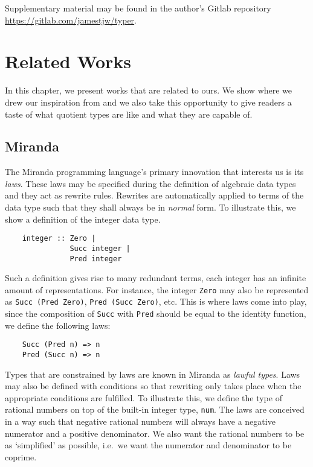 \documentclass[12pt,twoside,maitrise]{dms}
\theoremstyle{definition}
\numberwithin{equation}{section}
\numberwithin{table}{chapter}
\numberwithin{figure}{chapter}
\newcommand\id[1] {\texttt{#1}}
\newcommand\fn[1] {\texttt{#1}}
\begin{document}
Supplementary material may be found in the author's Gitlab repository
\url{https://gitlab.com/jamestjw/typer}.


\chapter{Related Works}

In this chapter, we present works that are related to ours. We show where we
drew our inspiration from and we also take this opportunity to give readers a
taste of what quotient types are like and what they are capable of.

\section{Miranda}

The Miranda programming language's\cite{thompson1986laws, thompson1990lawful}
primary innovation that interests us is its \emph{laws}. These laws may be
specified during the definition of algebraic data types and they act as rewrite
rules. Rewrites are automatically applied to terms of the data type such that
they shall always be in \emph{normal} form. To illustrate this, we show a
definition of the integer data type.

\begin{verbatim}
    integer :: Zero |
               Succ integer |
               Pred integer
\end{verbatim}

Such a definition gives rise to many redundant terms, each integer has an
infinite amount of representations. For instance, the integer \id{Zero} may also
be represented as \fn{Succ (Pred Zero)}, \fn{Pred (Succ Zero)}, etc. This is
where laws come into play, since the composition of \id{Succ} with \id{Pred}
should be equal to the identity function, we define the following laws:

\begin{verbatim}
    Succ (Pred n) => n
    Pred (Succ n) => n
\end{verbatim}

Types that are constrained by laws are known in Miranda as \emph{lawful types}.
Laws may also be defined with conditions so that rewriting only takes place when
the appropriate conditions are fulfilled. To illustrate this, we define the type
of rational numbers on top of the built-in integer type, \id{num}. The laws are
conceived in a way such that negative rational numbers will always have a
negative numerator and a positive denominator. We also want the rational numbers
to be as `simplified' as possible, i.e.\ we want the numerator and denominator
to be coprime.
\end{document}
